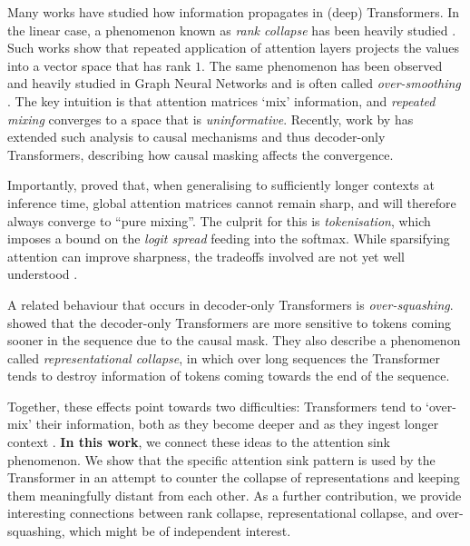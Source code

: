 \documentclass{article} %
\begin{document}
Many works have studied how information propagates in (deep) Transformers. In the linear case, a phenomenon known as \emph{rank collapse} has been heavily studied \citep{dong2021attention,geshkovski2023mathematical,wu2024role,naderi2024mind}. Such works show that repeated application of attention layers projects the values into a vector space that has rank $1$. The same phenomenon has been observed and heavily studied in Graph Neural Networks and is often called \emph{over-smoothing} \citep{di2022understanding,keriven2022not}. The key intuition is that attention matrices `mix' information, and \emph{repeated mixing} converges to a space that is \emph{uninformative}. Recently, work by \citet{wu2024role} has extended such analysis to causal mechanisms and thus decoder-only Transformers, describing how causal masking affects the convergence.

Importantly, \citet{velivckovic2024softmax} proved that, when generalising to sufficiently longer contexts at inference time, global attention matrices cannot remain sharp, and will therefore always converge to ``pure mixing''. The culprit for this is \emph{tokenisation}, which imposes a bound on the \emph{logit spread} feeding into the softmax. While sparsifying attention can improve sharpness, the tradeoffs involved are not yet well understood \citep{vitvitskyi2025makes}.

A related behaviour that occurs in decoder-only Transformers is \emph{over-squashing}. \cite{barbero2024transformers} showed that the decoder-only Transformers are more sensitive to tokens coming sooner in the sequence due to the causal mask. They also describe a phenomenon called \emph{representational collapse}, in which over long sequences the Transformer tends to destroy information of tokens coming towards the end of the sequence. 

Together, these effects point towards two difficulties: Transformers tend to `over-mix' their information, both as they become deeper \citep{barbero2024transformers} and as they ingest longer context \citep{velivckovic2024softmax}.  \textbf{In this work}, we connect these ideas to the attention sink phenomenon. We show that the specific attention sink pattern is used by the Transformer in an attempt to counter the collapse of representations and keeping them meaningfully distant from each other. As a further contribution, we provide interesting connections between rank collapse, representational collapse, and over-squashing, which might be of independent interest.
\end{document}
